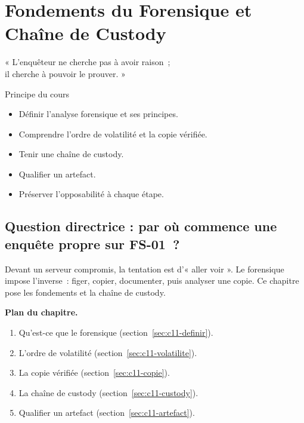 
\chapter{Fondements du Forensique et Chaîne de Custody}
\label{chap:fondements}

\epigraph{%
    « L'enquêteur ne cherche pas à avoir raison~;\\
    il cherche à pouvoir le prouver. »%
}{Principe du cours}


\begin{boxobjectifs}
\begin{itemize}
    \item Définir l'analyse forensique et ses principes.
    \item Comprendre l'ordre de volatilité et la copie vérifiée.
    \item Tenir une chaîne de custody.
    \item Qualifier un artefact.
    \item Préserver l'opposabilité à chaque étape.
\end{itemize}
\end{boxobjectifs}

\bigskip

\section*{Question directrice : par où commence une enquête propre sur FS-01~?}

Devant un serveur compromis, la tentation est d'« aller voir ». Le forensique
impose l'inverse~: figer, copier, documenter, puis analyser une copie. Ce
chapitre pose les fondements et la chaîne de custody.

\medskip
\textbf{Plan du chapitre.}
\begin{enumerate}
    \item Qu'est-ce que le forensique (section~\ref{sec:c11-definir}).
    \item L'ordre de volatilité (section~\ref{sec:c11-volatilite}).
    \item La copie vérifiée (section~\ref{sec:c11-copie}).
    \item La chaîne de custody (section~\ref{sec:c11-custody}).
    \item Qualifier un artefact (section~\ref{sec:c11-artefact}).
\end{enumerate}

